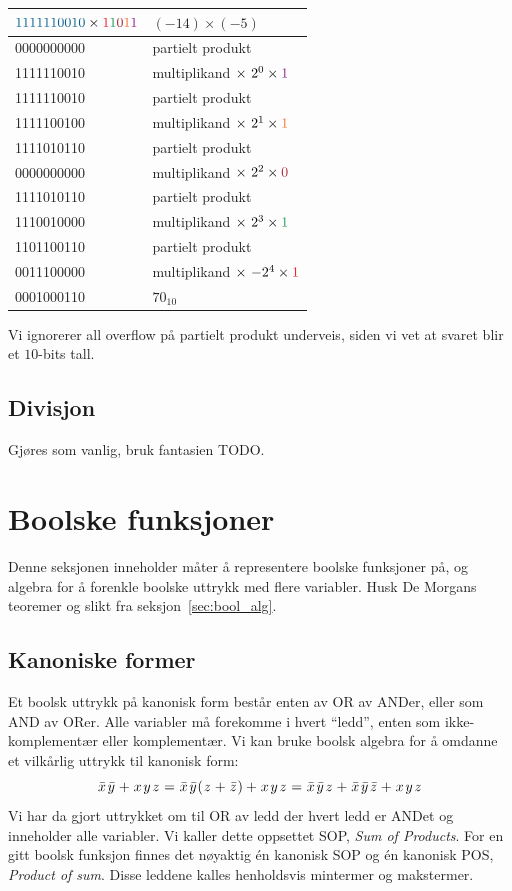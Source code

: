 \documentclass[12pt,a4paper,norsk]{article}
\newcommand{\red}[1]{{\color{Red}#1}}
\newcommand{\green}[1]{{\color{ForestGreen}#1}}
\newcommand{\blue}[1]{{\color{MidnightBlue}#1}}
\newcommand{\orange}[1]{{\color{Orange}#1}}
\newcommand{\purple}[1]{{\color{Plum}#1}}
\newcommand{\maroon}[1]{{\color{Maroon}#1}}
\begin{document}
\begin{center}
  \begin{tabular}{ll}
    $\blue{1111110010} \times \mult$ & $(-14)\times(-5)$ \\
    \midrule
    0000000000 & partielt produkt \\
    \blue{1111110010} & multiplikand $\times\ 2^0 \times \purple{1}$ \\
    \midrule
    1111110010 & partielt produkt \\
    \blue{111110010}0 & multiplikand $\times\ 2^1 \times \orange{1}$ \\
    \midrule
    1111010110 & partielt produkt \\
    \blue{00000000}00 & multiplikand $\times\ 2^2 \times \maroon{0}$ \\
    \midrule
    1111010110 & partielt produkt \\
    \blue{1110010}000 & multiplikand $\times\ 2^3 \times \green{1}$ \\
    \midrule
    1101100110 & partielt produkt \\
    \blue{001110}0000 & multiplikand $\times\ {-2^4} \times \red{1}$ \\
    \midrule
    0001000110 & $70_{10}$ \\
    \bottomrule
    \bottomrule
  \end{tabular}
\end{center}

Vi ignorerer all overflow på partielt produkt underveis, siden vi vet at svaret
blir et $10$-bits tall.

\subsection{Divisjon}
Gjøres som vanlig, bruk fantasien TODO.

\section{Boolske funksjoner}\label{sec:bool_func}
Denne seksjonen inneholder måter å representere boolske funksjoner på, og
algebra for å forenkle boolske uttrykk med flere variabler. Husk De Morgans
teoremer og slikt fra seksjon~\ref{sec:bool_alg}.

\subsection{Kanoniske former}
Et boolsk uttrykk på kanonisk form består enten av OR av ANDer, eller som AND av ORer.
Alle variabler må forekomme i hvert ``ledd'', enten som ikke-komplementær eller
komplementær. Vi kan bruke boolsk algebra for å omdanne et vilkårlig uttrykk til
kanonisk form:
\[\kom{x}\kom{y} + \var{x}\var{y}\var{z} = \kom{x}\kom{y}(\var{z} + \kom{z}) +
  \var{x}\var{y}\var{z} =  \kom{x}\kom{y}\var{z} + \kom{x}\kom{y}\kom{z} + \var{x}\var{y}\var{z}\]
Vi har da gjort uttrykket om til OR av ledd der hvert ledd er ANDet og
inneholder alle variabler. Vi kaller dette oppsettet SOP, \textit{Sum of
  Products}. For en gitt boolsk funksjon finnes det nøyaktig én kanonisk SOP og
én kanonisk POS, \textit{Product of sum}. Disse leddene kalles henholdsvis
mintermer og makstermer.
\end{document}
